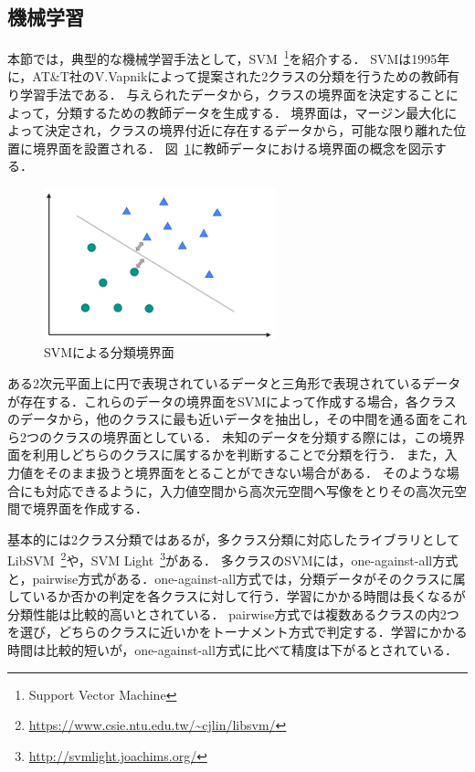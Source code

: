 \subsection{機械学習}
本節では，典型的な機械学習手法として，SVM~\footnote{Support Vector Machine}を紹介する．
SVMは1995年に，AT\&T社のV.Vapnikによって提案された2クラスの分類を行うための教師有り学習手法である．
与えられたデータから，クラスの境界面を決定することによって，分類するための教師データを生成する．
境界面は，マージン最大化によって決定され，クラスの境界付近に存在するデータから，可能な限り離れた位置に境界面を設置される．
図~\ref{fig-svm}に教師データにおける境界面の概念を図示する．
\begin{figure}[H]
	\centering
    \includegraphics[width=0.6\textwidth,pagebox=artbox]{fig/svm.png}
    \caption{SVMによる分類境界面}
    \label{fig-svm}
\end{figure}
ある2次元平面上に円で表現されているデータと三角形で表現されているデータが存在する．これらのデータの境界面をSVMによって作成する場合，各クラスのデータから，他のクラスに最も近いデータを抽出し，その中間を通る面をこれら2つのクラスの境界面としている．
未知のデータを分類する際には，この境界面を利用しどちらのクラスに属するかを判断することで分類を行う．
また，入力値をそのまま扱うと境界面をとることができない場合がある．
そのような場合にも対応できるように，入力値空間から高次元空間へ写像をとりその高次元空間で境界面を作成する．

基本的には2クラス分類ではあるが，多クラス分類に対応したライブラリとしてLibSVM~\footnote{\url{https://www.csie.ntu.edu.tw/~cjlin/libsvm/}}や，SVM Light~\footnote{\url{http://svmlight.joachims.org/}}がある．
多クラスのSVMには，one-against-all方式と，pairwise方式がある．one-against-all方式では，分類データがそのクラスに属しているか否かの判定を各クラスに対して行う．学習にかかる時間は長くなるが分類性能は比較的高いとされている．
pairwise方式では複数あるクラスの内2つを選び，どちらのクラスに近いかをトーナメント方式で判定する．学習にかかる時間は比較的短いが，one-against-all方式に比べて精度は下がるとされている．